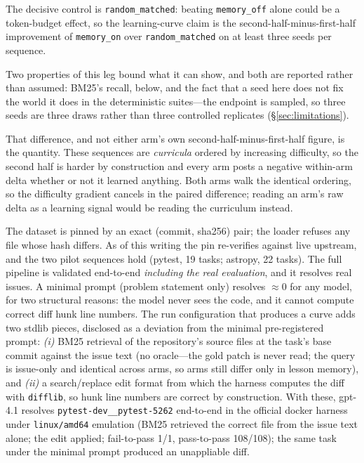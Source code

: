 The decisive control is \texttt{random\_matched}: beating
\texttt{memory\_off} alone could be a token-budget effect, so the
learning-curve claim is the second-half-minus-first-half improvement of
\texttt{memory\_on} over \texttt{random\_matched} on at least three
seeds per sequence.

Two properties of this leg bound what it can show, and both are reported
rather than assumed: BM25's recall, below, and the fact that a seed here
does not fix the world it does in the deterministic suites---the endpoint
is sampled, so three seeds are three draws rather than three controlled
replicates (\S\ref{sec:limitations}).

That difference, and not either arm's own second-half-minus-first-half
figure, is the quantity. These sequences are \emph{curricula} ordered by
increasing difficulty, so the second half is harder by construction and
every arm posts a negative within-arm delta whether or not it learned
anything. Both arms walk the identical ordering, so the difficulty
gradient cancels in the paired difference; reading an arm's raw delta as
a learning signal would be reading the curriculum instead.

The dataset is pinned by an exact (commit, sha256) pair; the loader
refuses any file whose hash differs. As of this writing the pin
re-verifies against live upstream, and the two pilot sequences hold
(pytest, 19 tasks; astropy, 22 tasks). The full pipeline is validated
end-to-end \emph{including the real evaluation}, and it resolves real
issues. A minimal prompt (problem statement only) resolves $\approx 0$ for
any model, for two structural reasons: the model never sees the code, and
it cannot compute correct diff hunk line numbers. The run configuration
that produces a curve adds two stdlib pieces, disclosed as a deviation
from the minimal pre-registered prompt: \emph{(i)} BM25 retrieval of the
repository's source files at the task's base commit against the issue text
(no oracle---the gold patch is never read; the query is issue-only and
identical across arms, so arms still differ only in lesson memory), and
\emph{(ii)} a search/replace edit format from which the harness computes
the diff with \texttt{difflib}, so hunk line numbers are correct by
construction. With these, gpt-4.1 resolves \texttt{pytest-dev\_\_pytest-5262}
end-to-end in the official docker harness under \texttt{linux/amd64}
emulation (BM25 retrieved the correct file from the issue text alone; the
edit applied; fail-to-pass 1/1, pass-to-pass 108/108); the same task under
the minimal prompt produced an unappliable diff.

